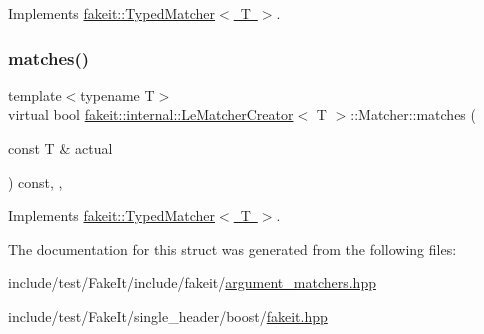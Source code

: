 Implements \mbox{\hyperlink{structfakeit_1_1TypedMatcher_ac553bb6ac7c98a489c92fa6ace0f2e2b}{fakeit\+::\+Typed\+Matcher$<$ T $>$}}.

\mbox{\label{structfakeit_1_1internal_1_1LeMatcherCreator_1_1Matcher_a9df22204323939912395f8a4c64d0698}} 
\subsubsection{\texorpdfstring{matches()}{matches()}\hspace{0.1cm}{\footnotesize\ttfamily [9/9]}}
{\footnotesize\ttfamily template$<$typename T$>$ \\
virtual bool \mbox{\hyperlink{structfakeit_1_1internal_1_1LeMatcherCreator}{fakeit\+::internal\+::\+Le\+Matcher\+Creator}}$<$ T $>$\+::Matcher\+::matches (\begin{DoxyParamCaption}\item[{const T \&}]{actual }\end{DoxyParamCaption}) const\hspace{0.3cm}{\ttfamily [inline]}, {\ttfamily [override]}, {\ttfamily [virtual]}}



Implements \mbox{\hyperlink{structfakeit_1_1TypedMatcher_ac553bb6ac7c98a489c92fa6ace0f2e2b}{fakeit\+::\+Typed\+Matcher$<$ T $>$}}.



The documentation for this struct was generated from the following files\+:\begin{DoxyCompactItemize}
\item 
include/test/\+Fake\+It/include/fakeit/\mbox{\hyperlink{argument__matchers_8hpp}{argument\+\_\+matchers.\+hpp}}\item 
include/test/\+Fake\+It/single\+\_\+header/boost/\mbox{\hyperlink{single__header_2boost_2fakeit_8hpp}{fakeit.\+hpp}}\end{DoxyCompactItemize}
